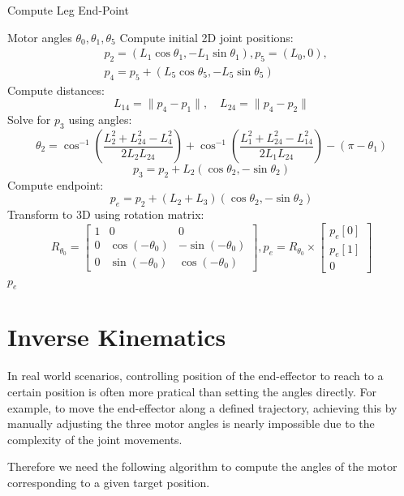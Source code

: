 \documentclass[a4paper,11pt]{article}
\begin{document}
\begin{algorithm}[H]
	\caption{Compute Leg End-Point}
	\begin{algorithmic}[1]
			\Require Motor angles $\theta_0, \theta_1, \theta_5$
			\State Compute initial 2D joint positions:
			\begin{align*}
				&p_2 = (L_1 \cos \theta_1, -L_1 \sin \theta_1), p_5 = (L_0, 0), \\
				&p_4 = p_5 + (L_5 \cos \theta_5, -L_5 \sin \theta_5)
			\end{align*}
			\State Compute distances:
			$$
					L_{14} = \| p_4 - p_1 \|, \quad
					L_{24} = \| p_4 - p_2 \|
			$$
			\State Solve for $p_3$ using angles:
			$$
					\theta_2 = \cos^{-1} \left( \frac{L_2^2 + L_{24}^2 - L_4^2}{2 L_2 L_{24}} \right) +
										 \cos^{-1} \left( \frac{L_1^2 + L_{24}^2 - L_{14}^2}{2 L_1 L_{24}} \right) - (\pi - \theta_1)
			$$
			$$
					p_3 = p_2 + L_2 (\cos \theta_2, -\sin \theta_2)
			$$
			\State Compute endpoint:
			$$
					p_e = p_2 + (L_2 + L_3)(\cos \theta_2, -\sin \theta_2)
			$$
			\State Transform to 3D using rotation matrix:
			$$
				R_{\theta_0} =
				\begin{bmatrix}
						1 & 0 & 0 \\
						0 & \cos(-\theta_0) & -\sin(-\theta_0) \\
						0 & \sin(-\theta_0) & \cos(-\theta_0)
				\end{bmatrix}, 
				p_e = R_{\theta_0} \times \begin{bmatrix} p_e[0] \\ p_e[1] \\ 0 \end{bmatrix}
			$$
			\State \Return $p_e$
	\end{algorithmic}
\end{algorithm}

\section{Inverse Kinematics}

In real world scenarios, controlling position of the end-effector to reach to a certain position
is often more pratical than setting the angles directly. For example, to move the end-effector along 
a defined trajectory, achieving this by manually adjusting the three motor angles is nearly impossible 
due to the complexity of the joint movements. 

Therefore we need the following algorithm 
to compute the angles of the motor corresponding to a given target position.
\end{document}

